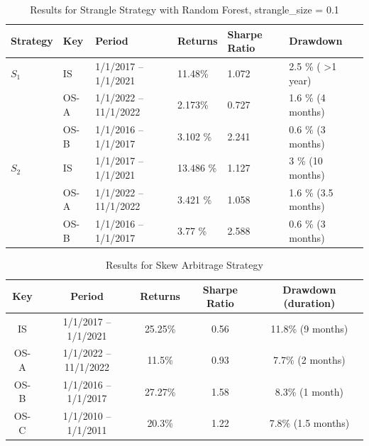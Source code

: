 \documentclass[10pt]{article}
\theoremstyle{definition}
\begin{document}
\begin{table}[]
\begin{center}
\begin{tabular}{@{}llllll @{}}
\toprule
 \textbf{Strategy}     & \textbf{Key}& \textbf{Period} &  \textbf{Returns} & \textbf{Sharpe Ratio} & \textbf{Drawdown} \\ \midrule
 $S_1$ &IS & 1/1/2017 – 1/1/2021   &  11.48\%  &  1.072
 & 2.5 \% ( >1 year)\\
  & OS-A & 1/1/2022 – 11/1/2022 & 2.173\% & 0.727  & 1.6 \% (4 months)  \\
 &OS-B & 1/1/2016 – 1/1/2017   & 3.102 \% & 2.241 & 0.6 \% (3 months)\\ \midrule
  $S_2$ &IS & 1/1/2017 – 1/1/2021  & 13.486 \%  & 1.127&  3 \% (10 months) \\
 & OS-A & 1/1/2022 – 11/1/2022 & 3.421 \% &  1.058 &  1.6 \% (3.5 months) \\
 &OS-B & 1/1/2016 – 1/1/2017  &3.77 \% & 2.588 & 0.6 \% (3 months) \\ \midrule
\end{tabular}
\caption{Results for Strangle Strategy with Random Forest, strangle\_size = 0.1}
\label{ResultsRF}
\end{center}
\end{table}



\begin{table}[]
    \begin{center}
        \begin{tabular}{@{}ccccc @{}}
            \toprule
            \textbf{Key} & \textbf{Period}      & \textbf{Returns} & \textbf{Sharpe Ratio} & \textbf{Drawdown (duration)} \\ \midrule
            IS & 1/1/2017 – 1/1/2021  & 25.25\%   & 0.56 & 11.8\% (9 months) \\
            OS-A & 1/1/2022 – 11/1/2022 & 11.5\%   & 0.93 & 7.7\% (2 months) \\
            OS-B & 1/1/2016 – 1/1/2017  & 27.27\%   & 1.58 & 8.3\%  (1 month) \\
            OS-C &  1/1/2010 – 1/1/2011  & 20.3\%   & 1.22 & 7.8\% (1.5 months) \\\midrule
        \end{tabular}
        \caption{Results for Skew Arbitrage Strategy}
        \label{ResultsSkew}
    \end{center}
\end{table}
\end{document}
